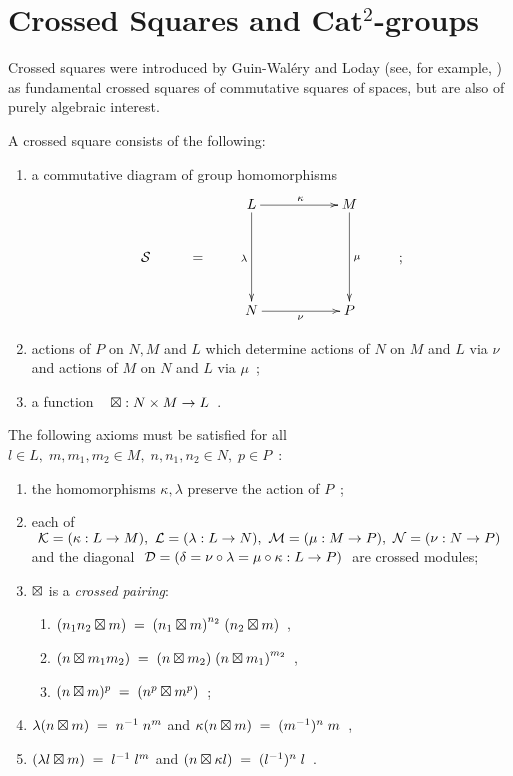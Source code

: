
\section{Crossed Squares and Cat$^2$-groups} \label{sect:xsq-cat2}

Crossed squares were introduced by Guin-Wal\'ery and Loday 
(see, for example, \cite{walery:loday,loday1,brow:lod})
as fundamental crossed squares of commutative squares of spaces,
but are also of purely algebraic interest.

\begin{defn} \label{def:xsq}  
A crossed square consists of the following:
\begin{enumerate}[{\rm (i)}]
\item
a commutative diagram of group homomorphisms
\begin{equation} \label{eq:Ssquare}
\vcenter{\xymatrix{
       &   &  L \ar[rr]^{\kappa} \ar[dd]_{\lambda} 
              && M \ar[dd]^{\mu} &   \\
\calS  & = &  &&                 & ; \\
       &   &  N \ar[rr]_{\nu}  
              && P 
}} 
\end{equation}
\item
actions of $P$ on $N, M$ and $L$ 
which determine actions of 
$N$ on $M$ and $L$ via $\nu$ 
and actions of 
$M$ on $N$ and $L$ via $\mu$~;
\item
a function ~ $\boxtimes : N \times M \to L$~.
\end{enumerate}
The following axioms must be satisfied for all 
$l \in L,\; m,m_1,m_2 \in M,\; 
n,n_1,n_2 \in N,\; p \in P$~:
\begin{enumerate}[{\rm (a)}]
\item 
the homomorphisms $\kappa, \lambda$ preserve the action of $P$~;
\item 
each of 
$~\mathcal{K} = (\kappa : L \to M),
 ~\mathcal{L} = (\lambda : L \to N), 
 ~\mathcal{M}  = (\mu : M \to P),
 ~\mathcal{N}  = (\nu : N \to P)~$
and the diagonal  
$~\mathcal{D} = (\delta = \nu\circ\lambda = \mu\circ\kappa : L \to P)~$ 
are crossed modules;
\item 
$\boxtimes$ is a \emph{crossed pairing}:
\begin{enumerate}[{\rm (i)}]
\item
$(n_1n_2 \boxtimes m)\;=\;{(n_1 \boxtimes m)}^{n_2}\;(n_2 \boxtimes m)$~,
\item
$(n \boxtimes m_1m_2) \;=\; (n \boxtimes m_2)\;{(n \boxtimes m_1)}^{m_2}$~,
\item 
$(n \boxtimes m)^{p} \;=\; (n^p \boxtimes m^p)$~;
\end{enumerate}
\item\quad
$\lambda (n \boxtimes m) \;=\; n^{-1}\;n^m$
\quad \mbox{and} \quad
$\kappa (n \boxtimes m) \;=\; (m^{-1})^n\;m$~, 
\item\quad
$(\lambda l \boxtimes m) \;=\; l^{-1}\;l^m$ 
\quad \mbox{and} \quad
$(n \boxtimes \kappa l) \;=\; (l^{-1})^n\;l$~. 
\end{enumerate}
\end{defn}

